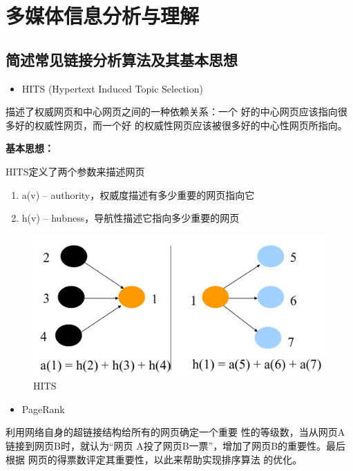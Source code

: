 \documentclass[UTF8,a4paper,AutoFakeBold,AutoFakeSlant]{ctexart}
\begin{document}

\section{多媒体信息分析与理解}


\subsection{简述常见链接分析算法及其基本思想}

\begin{itemize}
	\item HITS (Hypertext Induced Topic Selection)
\end{itemize}

描述了权威网页和中心网页之间的一种依赖关系：一个
好的中心网页应该指向很多好的权威性网页，而一个好
的权威性网页应该被很多好的中心性网页所指向。

\textbf{基本思想：}

HITS定义了两个参数来描述网页
\begin{enumerate}
	\item a(v) – authority，权威度描述有多少重要的网页指向它
	\item h(v) – hubness，导航性描述它指向多少重要的网页
\end{enumerate}
\begin{figure}[H]
	\centering
	\includegraphics[scale=0.2]{hits.png}
	\caption{HITS}
	\label{f:hits}
\end{figure}

\begin{itemize}
	\item PageRank
\end{itemize}

利用网络自身的超链接结构给所有的网页确定一个重要
性的等级数，当从网页A链接到网页B时，就认为“网页
A投了网页B一票”，增加了网页B的重要性。最后根据
网页的得票数评定其重要性，以此来帮助实现排序算法
的优化。
\end{document}
